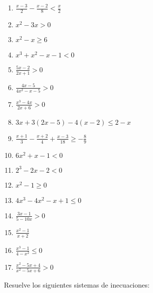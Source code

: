 \begin{enumerate}[topsep=0pt]
	\item $ \frac{x-3}{2} - \frac{x-2}{8} < \frac{x}{2} $
	\item $ x^2-3x > 0 $
	\item $ x^2 - x \ge 6 $
	\item $ x^3 +x^2 - x -1 < 0 $
	\item $ \frac{5x-2}{2x+1} > 0 $
	\item $ \frac{4x-5}{4x^2-x-5} > 0 $
	\item $ \frac{x^3-4x}{2x+6} > 0 $
	\item $ 3x+3(2x-5) - 4(x-2) \le 2-x$
	\item $ \frac{x+1}{3} - \frac{x+2}{4} + \frac{x-3}{18} \ge -\frac{8}{9}$
	\item $ 6x^2 + x -1 < 0$
	\item $ 2^3 -2x - 2 < 0$
	\item $ x^2 - 1 \ge 0$
	\item $ 4x^3 - 4x^2 - x +1 \le 0$
	\item $ \frac{3x-1}{5-10x} > 0$
	\item $ \frac{x^2-1}{x+2}$
	\item $ \frac{x^3 - 1}{4-x^2} \le 0$
	\item $ \frac{x^2-5x + 4}{x^2-5x + 6} > 0$
\end{enumerate}


\Exercicio Resuelve los siguientes sistemas de inecuaciones:

